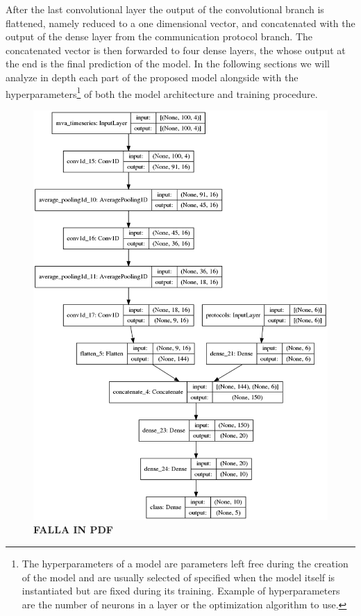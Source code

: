After the last convolutional layer the output of the convolutional branch is flattened, namely reduced to a one dimensional vector, and concatenated with the output of the dense layer from the communication protocol branch. The concatenated vector is then forwarded to four dense layers, the  whose output at the end is the final prediction of the model. In the following sections we will analyze in depth each part of the proposed model alongside with the hyperparameters\footnote{The hyperparameters of a model are parameters left free during the creation of the model and are usually selected of specified when the model itself is instantiated but are fixed during its training. Example of hyperparameters are the number of neurons in a layer or the optimization algorithm to use.} of both the model architecture and training procedure.


\begin{figure}
    \centering
\includegraphics[height=0.95\textheight]{images/models/model_1branch.png}
\caption{\textbf{FALLA IN PDF}}
    \label{fig:1b_model}
\end{figure}


